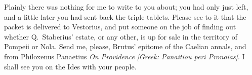 

 Plainly there was nothing for me to write to you about; you had only just left, and a little later you had sent back the triple-tablets. Please see to it that the packet is delivered to Vestorius, and put someone on the job of finding out whether Q.~Staberius' estate, or any other, is up for sale in the territory of Pompeii or Nola. Send me, please, Brutus' epitome of the Caelian annals, and from Philoxenus Panaetius \textit{On Providence} \textit{[Greek: Panaitiou peri Pronoias]}. I shall see you on the Ides with your people.
